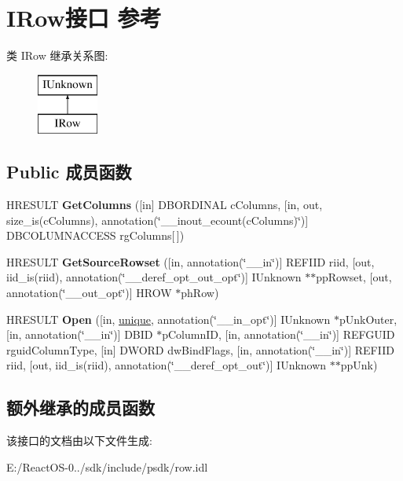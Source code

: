 \hypertarget{interface_i_row}{}\section{I\+Row接口 参考}
\label{interface_i_row}
类 I\+Row 继承关系图\+:\begin{figure}[H]
\begin{center}
\leavevmode
\includegraphics[height=2.000000cm]{interface_i_row}
\end{center}
\end{figure}
\subsection*{Public 成员函数}
\begin{DoxyCompactItemize}
\item 
\mbox{\label{interface_i_row_a080ab66379b7ac98dd97157c2ce5c545}} 
H\+R\+E\+S\+U\+LT {\bfseries Get\+Columns} (\mbox{[}in\mbox{]} D\+B\+O\+R\+D\+I\+N\+AL c\+Columns, \mbox{[}in, out, size\+\_\+is(c\+Columns), annotation(\char`\"{}\+\_\+\+\_\+inout\+\_\+ecount(c\+Columns)\char`\"{})\mbox{]} D\+B\+C\+O\+L\+U\+M\+N\+A\+C\+C\+E\+SS rg\+Columns\mbox{[}$\,$\mbox{]})
\item 
\mbox{\label{interface_i_row_aec034975f7c214e8a75b5ff9e4573322}} 
H\+R\+E\+S\+U\+LT {\bfseries Get\+Source\+Rowset} (\mbox{[}in, annotation(\char`\"{}\+\_\+\+\_\+in\char`\"{})\mbox{]} R\+E\+F\+I\+ID riid, \mbox{[}out, iid\+\_\+is(riid), annotation(\char`\"{}\+\_\+\+\_\+deref\+\_\+opt\+\_\+out\+\_\+opt\char`\"{})\mbox{]} I\+Unknown $\ast$$\ast$pp\+Rowset, \mbox{[}out, annotation(\char`\"{}\+\_\+\+\_\+out\+\_\+opt\char`\"{})\mbox{]} H\+R\+OW $\ast$ph\+Row)
\item 
\mbox{\label{interface_i_row_a1a7191355412a4a26619a2735704788a}} 
H\+R\+E\+S\+U\+LT {\bfseries Open} (\mbox{[}in, \hyperlink{interfaceunique}{unique}, annotation(\char`\"{}\+\_\+\+\_\+in\+\_\+opt\char`\"{})\mbox{]} I\+Unknown $\ast$p\+Unk\+Outer, \mbox{[}in, annotation(\char`\"{}\+\_\+\+\_\+in\char`\"{})\mbox{]} D\+B\+ID $\ast$p\+Column\+ID, \mbox{[}in, annotation(\char`\"{}\+\_\+\+\_\+in\char`\"{})\mbox{]} R\+E\+F\+G\+U\+ID rguid\+Column\+Type, \mbox{[}in\mbox{]} D\+W\+O\+RD dw\+Bind\+Flags, \mbox{[}in, annotation(\char`\"{}\+\_\+\+\_\+in\char`\"{})\mbox{]} R\+E\+F\+I\+ID riid, \mbox{[}out, iid\+\_\+is(riid), annotation(\char`\"{}\+\_\+\+\_\+deref\+\_\+opt\+\_\+out\char`\"{})\mbox{]} I\+Unknown $\ast$$\ast$pp\+Unk)
\end{DoxyCompactItemize}
\subsection*{额外继承的成员函数}


该接口的文档由以下文件生成\+:\begin{DoxyCompactItemize}
\item 
E\+:/\+React\+O\+S-\/0../sdk/include/psdk/row.\+idl\end{DoxyCompactItemize}
